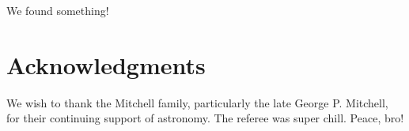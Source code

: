 \documentclass[twocolumn]{aastex61}
\begin{document}
We found something!
   
   
\section*{Acknowledgments}


We wish to thank the Mitchell family, particularly the late George P. Mitchell, for their continuing support of astronomy.
The referee was super chill.
Peace, bro!








\end{document}
